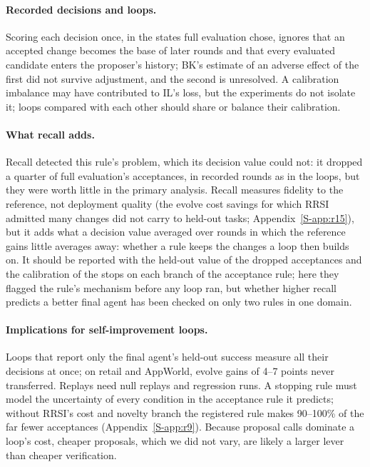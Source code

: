 \documentclass[11pt]{article}
\begin{document}
\paragraph{Recorded decisions and loops.} Scoring each decision once, in the states full evaluation chose, ignores that an accepted change becomes the base of later rounds and that every evaluated candidate enters the proposer's history; BK's estimate of an adverse effect of the first did not survive adjustment, and the second is unresolved. A calibration imbalance may have contributed to IL's loss, but the experiments do not isolate it; loops compared with each other should share or balance their calibration.

\paragraph{What recall adds.} Recall detected this rule's problem, which its decision value could not: it dropped a quarter of full evaluation's acceptances, in recorded rounds as in the loops, but they were worth little in the primary analysis. Recall measures fidelity to the reference, not deployment quality (the evolve cost savings for which RRSI admitted many changes did not carry to held-out tasks; Appendix~\ref*{S-app:r15}), but it adds what a decision value averaged over rounds in which the reference gains little averages away: whether a rule keeps the changes a loop then builds on. It should be reported with the held-out value of the dropped acceptances and the calibration of the stops on each branch of the acceptance rule; here they flagged the rule's mechanism before any loop ran, but whether higher recall predicts a better final agent has been checked on only two rules in one domain.

\paragraph{Implications for self-improvement loops.} Loops that report only the final agent's held-out success \citep{chen2026harnessfix,zhang2026ace,rrsi2026} measure all their decisions at once; on retail and AppWorld, evolve gains of 4--7 points never transferred. Replays need null replays and regression runs. A stopping rule must model the uncertainty of every condition in the acceptance rule it predicts; without RRSI's cost and novelty branch the registered rule makes 90--100\% of the far fewer acceptances (Appendix~\ref*{S-app:r9}). Because proposal calls dominate a loop's cost, cheaper proposals, which we did not vary, are likely a larger lever than cheaper verification.
\end{document}
